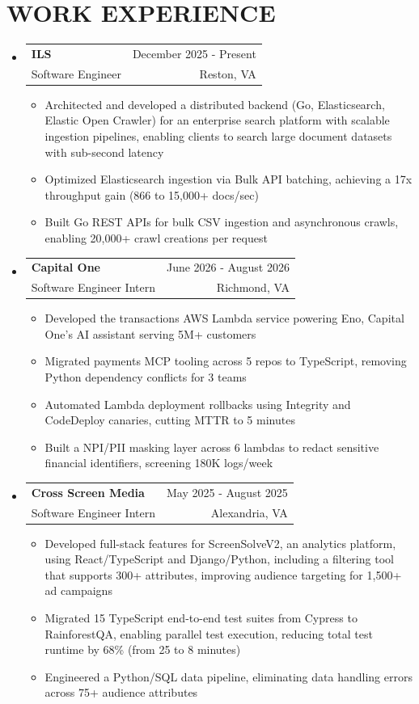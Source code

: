 \documentclass[letterpaper,11pt]{article}
\makeatletter
\newcommand{\resumeItem}[1]{
  \item\small{
    {#1 \vspace{-2pt}}
  }
}
\newcommand{\resumeSubheading}[4]{
  \vspace{-2pt}\item
    \begin{tabular*}{1\textwidth}[t]{l@{\extracolsep{\fill}}r}
      \textbf{#1} & #2 \\
      {\small#3} & {\small #4} \\
    \end{tabular*}\vspace{-7pt}
}
\newcommand{\resumeSubHeadingListStart}{\begin{itemize}[leftmargin=0in, label={}]}
\newcommand{\resumeSubHeadingListEnd}{\end{itemize}}
\newcommand{\resumeItemListStart}{\begin{itemize}}
\newcommand{\resumeItemListEnd}{\end{itemize}\vspace{-4pt}}
\makeatother
\begin{document}
\section{WORK EXPERIENCE}
  \resumeSubHeadingListStart
      \resumeSubheading
      {ILS}{December 2025 - Present}
      {Software Engineer}{Reston, VA}
       \resumeItemListStart
       \resumeItem{Architected and developed a distributed backend (Go, Elasticsearch, Elastic Open Crawler) for an enterprise search platform with scalable ingestion pipelines, enabling clients to search large document datasets with sub-second latency}
        \resumeItem{Optimized Elasticsearch ingestion via Bulk API batching, achieving a 17x throughput gain (866 to 15,000+ docs/sec)}
        \resumeItem{Built Go REST APIs for bulk CSV ingestion and asynchronous crawls, enabling 20,000+ crawl creations per request}
      \resumeItemListEnd
      \resumeSubheading
      {Capital One}{June 2026 - August 2026}
      {Software Engineer Intern}{Richmond, VA}
        \resumeItemListStart
        \resumeItem{Developed the transactions AWS Lambda service powering Eno, Capital One's AI assistant serving 5M+ customers}
        \resumeItem{Migrated payments MCP tooling across 5 repos to TypeScript, removing Python dependency conflicts for 3 teams}
        \resumeItem{Automated Lambda deployment rollbacks using Integrity and CodeDeploy canaries, cutting MTTR to 5 minutes}
        \resumeItem{Built a NPI/PII masking layer across 6 lambdas to redact sensitive financial identifiers, screening 180K logs/week}
    \resumeItemListEnd
    \resumeSubheading
      {Cross Screen Media}{May 2025 - August 2025}
      {Software Engineer Intern}{Alexandria, VA}
      \resumeItemListStart
        \resumeItem{Developed full-stack features for ScreenSolveV2, an analytics platform, using React/TypeScript and Django/Python, including a filtering tool that supports 300+ attributes, improving audience targeting for 1,500+ ad campaigns}
        \resumeItem{Migrated 15 TypeScript end-to-end test suites from Cypress to RainforestQA, enabling parallel test execution, reducing total test runtime by 68\% (from 25 to 8 minutes)}
        \resumeItem{Engineered a Python/SQL data pipeline, eliminating data handling errors across 75+ audience attributes}
      \resumeItemListEnd
  \resumeSubHeadingListEnd

\end{document}
